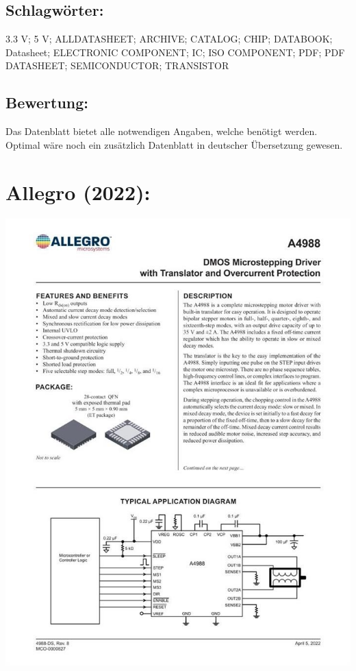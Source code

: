 \subsection*{Schlagwörter:}
3.3 V; 5 V; ALLDATASHEET; ARCHIVE; CATALOG; CHIP; DATABOOK; Datasheet; ELECTRONIC COMPONENT; IC; ISO COMPONENT; PDF; PDF DATASHEET; SEMICONDUCTOR; TRANSISTOR
\subsection*{Bewertung:}
Das Datenblatt bietet alle notwendigen Angaben, welche benötigt werden. Optimal wäre noch ein zusätzlich Datenblatt in deutscher Übersetzung gewesen.

\section*{Allegro (2022):}
\begin{minipage}{0.5\textwidth}
	\includegraphics[width=\linewidth]{../Appendix/Literaturverzeichnis/img/Allegro.jpg}
\end{minipage}
